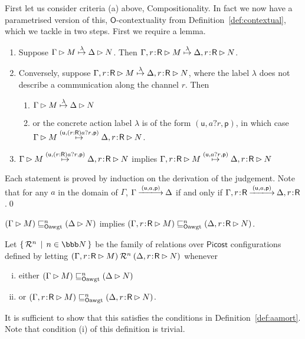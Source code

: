 \documentclass{LMCS}
\newcommand{\pfn}[1]{\mathsf{#1}}  \newcommand{\cfn}[1]{\mathsf{#1}}  \newcommand{\ownfnt}[1]{{\mathsf{#1}}}
\newcommand{\picost}{\ensuremath{\pfn{Picost}}\xspace}
\newcommand{\with}{\mathbin \rhd}
\newcommand{\cancom}[3]{({\ownfnt{#1}},{#2},{\ownfnt{#3}}) \xspace}
\newcommand{\nats}{\ensuremath{\bbb N}\xspace}
\newcommand{\ownO}{ {\ownfnt O}}
\newcommand{\Obsaamort}[2]{\mathrel{\sqsubseteq_{\rm #1 awgt}^{#2}}}
\newcommand{\Oaamort}[1]{\Obsaamort{\ownO}{ #1}}
\newcommand{\setof}[2]{\{ \, #1 \, \mid \, #2 \, \}}\newcommand{\sset}[1]{\{ {#1}  \}  }
\newcommand{\typeletter}[1]{{\mathsf{#1}}}
\newcommand{\tR}{\typeletter{R}}
\newcommand{\calR}{\mathbin{\mathcal{R}}}
\newcommand{\Cassoc}[2]{ {{#1}\kern -0.2em : \kern -0.2em {#2}}}
\newcommand{\ar}[1]{\mathbin{\xlongrightarrow{ #1}}}
\begin{document}
First let us consider criteria (a) above, Compositionality.  
In fact we now  have a parametrised version of this, $\ownO$-contextuality from
Definition~\ref{def:contextual}, which we tackle  in two steps.
First we require a lemma. 
\begin{lem}\label{lem:env.extend}\qquad
  \begin{enumerate}[\em(i)]
  \item   Suppose $\Gamma \with M \newar{\lambda} \Delta \with N$. Then 
  $\Gamma, \Cassoc{r}{\tR}  \with M \newar{\lambda} \Delta,\Cassoc{r}{\tR} \with N$.

 \item Conversely, suppose $\Gamma,\Cassoc{r}{\tR} \with M \newar{\lambda} \Delta,\Cassoc{r}{\tR} \with N$,
       where the label $\lambda$ does not describe a communication along the channel $r$. 
       Then 
       \begin{enumerate}[\em(a)]
       \item $\Gamma \with M \newar{\lambda} \Delta \with N$
       \item or the concrete action label $\lambda$ is of the form $\cancom{u}{a?r}{p}$, in which case
        $\Gamma \with M \newar{ \cancom{u}{(r:\tR)a?r}{p} } \Delta, \Cassoc{r}{\tR} \with N$.
       \end{enumerate}
  \item $\Gamma \with M  \newar{\cancom{u}{(r:\tR)a?r}{p}} \Delta, \Cassoc{r}{\tR} \with N$
   implies $\Gamma, \Cassoc{r}{\tR} \with M  \newar{\cancom{u}{a?r}{p}} \Delta, \Cassoc{r}{\tR} \with N$


  \end{enumerate}
\end{lem}
\proof
   Each statement is  proved by induction on the derivation of the judgement. 
Note that for any $a$ in the domain of $\Gamma$, 
$\Gamma \ar{\cancom{u}{a}{p}} \Delta$ if and only if 
 $\Gamma, \Cassoc{r}{\tR} \ar{\cancom{u}{a}{p}} \Delta,\Cassoc{r}{\tR}$.\qed

\begin{prop}[$\ownO$-contextual]\label{prop:a.extend}
  $ (\Gamma \with M) \Oaamort{n} (\Delta \with N)$ implies $ (\Gamma,
  \Cassoc{r} {\tR} \with M) \Oaamort{n} (\Delta, \Cassoc{r}{\tR} \with
  N)$.
\end{prop}
\proof
  Let $\setof{\calR^n}{n \in \nats}$ be the family of relations over \picost configurations
defined by letting
 $ (\Gamma, \Cassoc{r}{\tR} \with M) \calR^n (\Delta, \Cassoc{r}{\tR} \with N)$ 
whenever  
\begin{enumerate}[(i)]
\item either $ (\Gamma \with M) \Oaamort{n} (\Delta \with N)$

\item or $(\Gamma, \Cassoc{r}{\tR} \with M) \Oaamort{n} (\Delta, \Cassoc{r}{\tR} \with N)$.
\end{enumerate}
It is sufficient to show that this satisfies the conditions in
Definition~\ref{def:aamort}. Note that condition (i) of this
definition is trivial.
\end{document}
